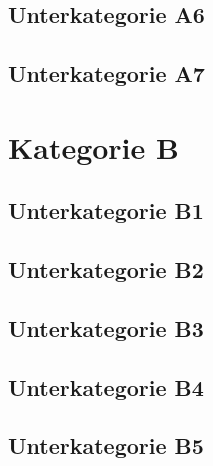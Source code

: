 \subsection{Unterkategorie A6}

\subsection{Unterkategorie A7}



\section{Kategorie B}
\subsection{Unterkategorie B1}


\subsection{Unterkategorie B2}


\subsection{Unterkategorie B3}

\subsection{Unterkategorie B4}

\subsection{Unterkategorie B5}


